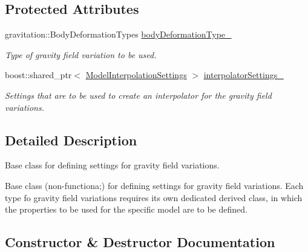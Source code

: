 \subsection*{Protected Attributes}
\begin{DoxyCompactItemize}
\item 
gravitation\+::\+Body\+Deformation\+Types \hyperlink{classtudat_1_1simulation__setup_1_1GravityFieldVariationSettings_a0ca6fcefc85945e00280718409b4e05c}{body\+Deformation\+Type\+\_\+}\hypertarget{classtudat_1_1simulation__setup_1_1GravityFieldVariationSettings_a0ca6fcefc85945e00280718409b4e05c}{}\label{classtudat_1_1simulation__setup_1_1GravityFieldVariationSettings_a0ca6fcefc85945e00280718409b4e05c}

\begin{DoxyCompactList}\small\item\em Type of gravity field variation to be used. \end{DoxyCompactList}\item 
boost\+::shared\+\_\+ptr$<$ \hyperlink{classtudat_1_1simulation__setup_1_1ModelInterpolationSettings}{Model\+Interpolation\+Settings} $>$ \hyperlink{classtudat_1_1simulation__setup_1_1GravityFieldVariationSettings_adbe509504009ea40cc9d664894ec29ec}{interpolator\+Settings\+\_\+}
\begin{DoxyCompactList}\small\item\em Settings that are to be used to create an interpolator for the gravity field variations. \end{DoxyCompactList}\end{DoxyCompactItemize}


\subsection{Detailed Description}
Base class for defining settings for gravity field variations. 

Base class (non-\/functiona;) for defining settings for gravity field variations. Each type fo gravity field variations requires its own dedicated derived class, in which the properties to be used for the specific model are to be defined. 

\subsection{Constructor \& Destructor Documentation}
